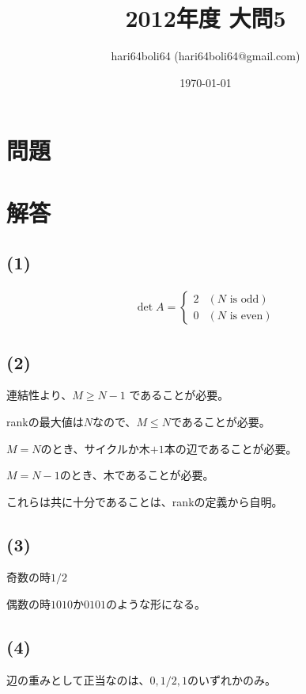 \documentclass[a4paper, 10pt, dvipdfmx]{jlreq}
\begin{document}
\title{2012年度 大問5}
\author{hari64boli64 (hari64boli64@gmail.com)}
\date{\today}
\maketitle

\section{問題}

\section{解答}

\subsection*{(1)}

\begin{align*}
  \det A=\begin{cases}
    2 & (N \text{ is odd})  \\
    0 & (N \text{ is even})
  \end{cases}
\end{align*}

\subsection*{(2)}

連結性より、$M \geq N - 1$ であることが必要。

rankの最大値は$N$なので、$M \leq N$であることが必要。

$M=N$のとき、サイクルか木$+1$本の辺であることが必要。

$M=N-1$のとき、木であることが必要。

これらは共に十分であることは、rankの定義から自明。

\subsection*{(3)}

奇数の時$1/2$

偶数の時$1010$か$0101$のような形になる。

\subsection*{(4)}

辺の重みとして正当なのは、$0,1/2,1$のいずれかのみ。
\end{document}

